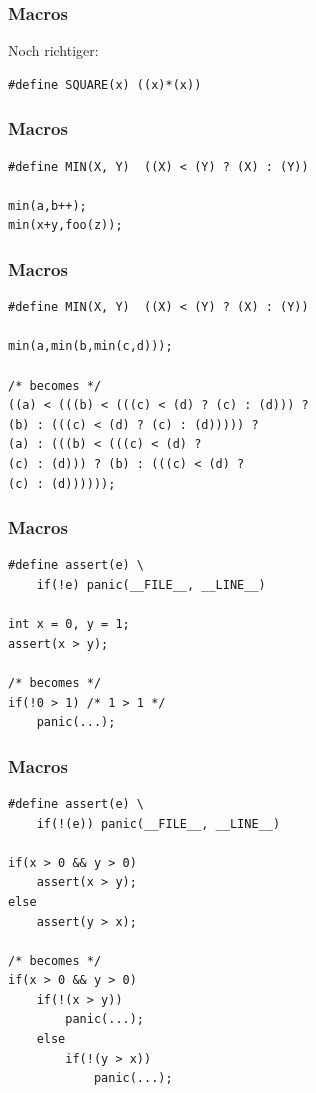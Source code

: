 \documentclass[12pt,compress]{beamer}
\begin{document}
\begin{frame}[fragile]
\frametitle{Macros}

Noch richtiger:

\begin{lstlisting}
#define SQUARE(x) ((x)*(x))
\end{lstlisting}
\end{frame}

\begin{frame}[fragile]
\frametitle{Macros}

\begin{lstlisting}
#define MIN(X, Y)  ((X) < (Y) ? (X) : (Y))

min(a,b++);
min(x+y,foo(z));
\end{lstlisting}
\end{frame}

\begin{frame}[fragile]
\frametitle{Macros}

\begin{lstlisting}
#define MIN(X, Y)  ((X) < (Y) ? (X) : (Y))

min(a,min(b,min(c,d)));

/* becomes */
((a) < (((b) < (((c) < (d) ? (c) : (d))) ?
(b) : (((c) < (d) ? (c) : (d))))) ?
(a) : (((b) < (((c) < (d) ?
(c) : (d))) ? (b) : (((c) < (d) ?
(c) : (d))))));
\end{lstlisting}
\end{frame}

\begin{frame}[fragile]
\frametitle{Macros}

\begin{lstlisting}
#define assert(e) \
	if(!e) panic(__FILE__, __LINE__)

int x = 0, y = 1;
assert(x > y);

/* becomes */
if(!0 > 1) /* 1 > 1 */
    panic(...);
\end{lstlisting}
\end{frame}


\begin{frame}[fragile]
\frametitle{Macros}

\begin{lstlisting}
#define assert(e) \
	if(!(e)) panic(__FILE__, __LINE__)

if(x > 0 && y > 0)
    assert(x > y);
else
    assert(y > x);

/* becomes */
if(x > 0 && y > 0)
    if(!(x > y))
        panic(...);
    else
        if(!(y > x))
            panic(...);
\end{lstlisting}
\end{frame}
\end{document}
